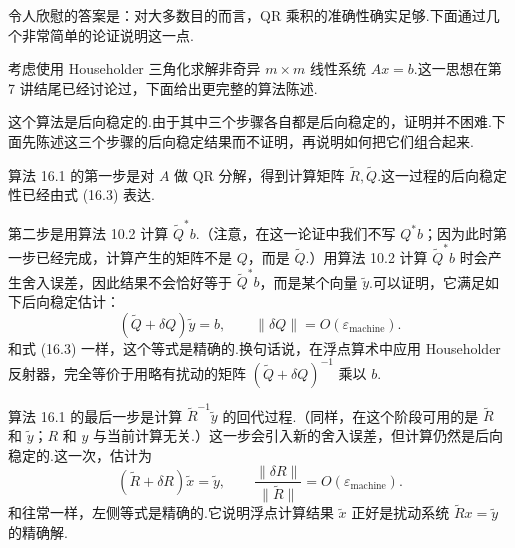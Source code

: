 \documentclass[UTF8,fontset=none,12pt]{ctexart}
\newcommand{\epsmach}{\varepsilon_{\mathrm{machine}}}
\theoremstyle{definition}
\begin{document}
令人欣慰的答案是：对大多数目的而言，QR 乘积的准确性确实足够.下面通过几个非常简单的论证说明这一点.

考虑使用 Householder 三角化求解非奇异 $m\times m$ 线性系统 $Ax=b$.这一思想在第 7 讲结尾已经讨论过，下面给出更完整的算法陈述.

\begin{center}
\end{center}

这个算法是后向稳定的.由于其中三个步骤各自都是后向稳定的，证明并不困难.下面先陈述这三个步骤的后向稳定结果而不证明，再说明如何把它们组合起来.

算法 16.1 的第一步是对 $A$ 做 QR 分解，得到计算矩阵 $\widetilde R,\widetilde Q$.这一过程的后向稳定性已经由式 (16.3) 表达.

第二步是用算法 10.2 计算 $\widetilde Q^*b$.（注意，在这一论证中我们不写 $Q^*b$；因为此时第一步已经完成，计算产生的矩阵不是 $Q$，而是 $\widetilde Q$.）用算法 10.2 计算 $\widetilde Q^*b$ 时会产生舍入误差，因此结果不会恰好等于 $\widetilde Q^*b$，而是某个向量 $\widetilde y$.可以证明，它满足如下后向稳定估计：
\begin{equation}
    (\widetilde Q+\delta Q)\widetilde y=b,
    \qquad
    \|\delta Q\|=O(\epsmach).
    \tag{16.4}
\end{equation}
和式 (16.3) 一样，这个等式是精确的.换句话说，在浮点算术中应用 Householder 反射器，完全等价于用略有扰动的矩阵 $(\widetilde Q+\delta Q)^{-1}$ 乘以 $b$.

算法 16.1 的最后一步是计算 $\widetilde R^{-1}\widetilde y$ 的回代过程.（同样，在这个阶段可用的是 $\widetilde R$ 和 $\widetilde y$；$R$ 和 $y$ 与当前计算无关.）这一步会引入新的舍入误差，但计算仍然是后向稳定的.这一次，估计为
\begin{equation}
    (\widetilde R+\delta R)\widetilde x=\widetilde y,
    \qquad
    \frac{\|\delta R\|}{\|\widetilde R\|}
    =O(\epsmach).
    \tag{16.5}
\end{equation}
和往常一样，左侧等式是精确的.它说明浮点计算结果 $\widetilde x$ 正好是扰动系统 $\widetilde R x=\widetilde y$ 的精确解.
\end{document}
